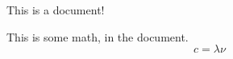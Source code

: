 This is a document!

This is some math, in the document.
\begin{equation}
    c = \lambda \nu
\end{equation}